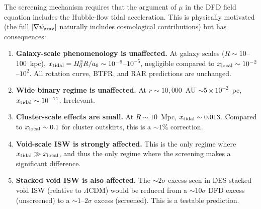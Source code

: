 \documentclass[11pt,a4paper]{article}
\newcommand{\LCDM}{$\Lambda$CDM}
\newcommand{\aM}{a_0}
\newcommand{\mufd}{\mu}
\newcommand{\psigrav}{\psi_{\rm grav}}
\newcommand{\ee}[1]{\times 10^{#1}}
\begin{document}
The screening mechanism requires that the argument of $\mufd$ in the
DFD field equation includes the Hubble-flow tidal acceleration. This
is physically motivated (the full $|\nabla\psigrav|$ naturally includes
cosmological contributions) but has consequences:

\begin{enumerate}
\item \textbf{Galaxy-scale phenomenology is unaffected.} At galaxy
  scales ($R \sim 10$--$100$~kpc), $x_{\rm tidal} = H_0^2 R/\aM
  \sim 10^{-6}$--$10^{-5}$, negligible compared to $x_{\rm local}
  \sim 10^{-2}$--$10^2$. All rotation curve, BTFR, and RAR
  predictions are unchanged.

\item \textbf{Wide binary regime is unaffected.} At $r \sim 10,000$~AU
  $\sim 5\ee{-2}$~pc, $x_{\rm tidal} \sim 10^{-11}$. Irrelevant.

\item \textbf{Cluster-scale effects are small.} At $R \sim 10$~Mpc,
  $x_{\rm tidal} \sim 0.013$. Compared to $x_{\rm local} \sim 0.1$
  for cluster outskirts, this is a $\sim 1\%$ correction.

\item \textbf{Void-scale ISW is strongly affected.} This is the only
  regime where $x_{\rm tidal} \gg x_{\rm local}$, and thus the only
  regime where the screening makes a significant difference.

\item \textbf{Stacked void ISW is also affected.} The $\sim 2\sigma$
  excess seen in DES stacked void ISW (relative to \LCDM) would
  be reduced from a $\sim 10\sigma$ DFD excess (unscreened) to a
  $\sim 1$--$2\sigma$ excess (screened). This is a testable prediction.
\end{enumerate}
\end{document}
